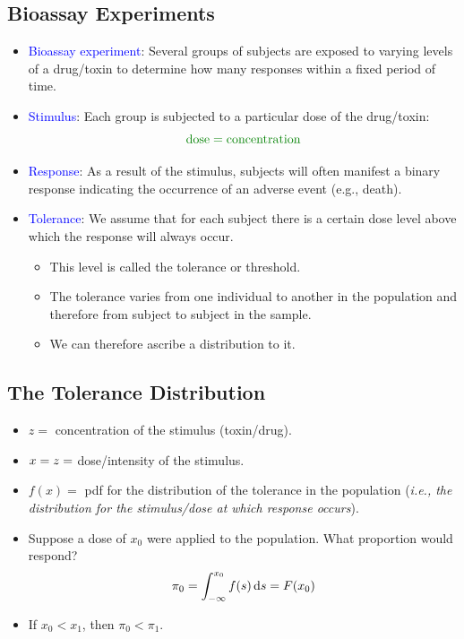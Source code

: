 \documentclass{article}\usepackage[]{graphicx}\usepackage[svgnames]{xcolor}
\let\log\relax%
\begin{document}
\subsection*{Bioassay Experiments}
\begin{itemize}
    \item \textcolor{Blue}{Bioassay experiment}: Several groups of subjects are exposed to varying levels
          of a drug/toxin to determine how many responses within a fixed period of time.
    \item \textcolor{Blue}{Stimulus}: Each group is subjected to a particular dose of the drug/toxin:
          \[ \textcolor{Green}{\text{dose}=\log{\text{concentration}}} \]
    \item \textcolor{Blue}{Response}: As a result of the stimulus, subjects will often manifest a binary
          response indicating the occurrence of an adverse event (e.g., death).
    \item \textcolor{Blue}{Tolerance}: We assume that for each subject there is a certain dose level above
          which the response will always occur.
          \begin{itemize}
              \item This level is called the tolerance or threshold.
              \item The tolerance varies from one individual to another in the population and therefore
                    from subject to subject in the sample.
              \item We can therefore ascribe a distribution to it.
          \end{itemize}
\end{itemize}
\subsection*{The Tolerance Distribution}
\begin{itemize}
    \item $ z =$ concentration of the stimulus (toxin/drug).
    \item $ x=\log{z} =$ dose/intensity of the stimulus.
    \item $ f(x)= $ pdf for the distribution of the tolerance in the population (\emph{i.e., the
              distribution for the stimulus/dose at which response occurs}).
    \item Suppose a dose of $ x_0 $ were applied to the population. What proportion would
          respond?
          \[ \pi_0=\int_{-\infty}^{x_0}f(s)\odif{s}=F(x_0) \]
    \item If $ x_0<x_1 $, then $ \pi_0<\pi_1 $.
\end{itemize}
\end{document}
